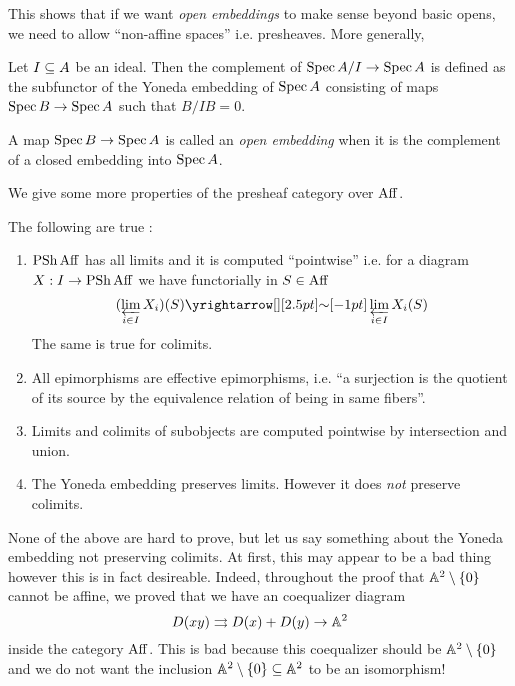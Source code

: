 \documentclass[./main.tex]{subfiles}
\begin{document}
This shows that if we want \emph{open embeddings} to make sense
beyond basic opens,
we need to allow ``non-affine spaces'' i.e. presheaves.
More generally,
\begin{dfn}

  Let $I \subseteq A$ be an ideal.
  Then the complement of $\operatorname{Spec} A / I \to \operatorname{Spec} A$
  is defined as the subfunctor of the Yoneda embedding of $\operatorname{Spec} A$
  consisting of maps $\operatorname{Spec} B \to \operatorname{Spec} A$
  such that $B / I B = 0$.

  A map $\operatorname{Spec} B \to \operatorname{Spec} A$ is called an \emph{open embedding}
  when it is the complement of a closed embedding into $\operatorname{Spec} A$.
\end{dfn}
We give some more properties of the presheaf category over $\mathrm{Aff}$.
\begin{prop}
  
  The following are true : 
  \begin{enumerate}
    \item $\operatorname{PSh} \mathrm{Aff}$ has all limits and it is computed
    ``pointwise'' i.e.
    for a diagram $X : I \to \operatorname{PSh} \mathrm{Aff}$ we have
    functorially in $S \in \mathrm{Aff}$
    \[
      (\LIM_{i \in I} X_i) (S) \map{\sim}{} \LIM_{i \in I} X_i(S)
    \]
    The same is true for colimits.
    \item All epimorphisms are effective epimorphisms,
    i.e. ``a surjection is the quotient of its source by 
    the equivalence relation of being in same fibers''.
    \item Limits and colimits of subobjects are computed pointwise
    by intersection and union.
    \item The Yoneda embedding preserves limits.
    However it does \emph{not} preserve colimits.
  \end{enumerate}
\end{prop}
None of the above are hard to prove,
but let us say something about the Yoneda embedding not preserving colimits.
At first, this may appear to be a bad thing
however this is in fact desireable.
Indeed, throughout the proof that $\mathbb{A}^2 \setminus \left\{0\right\}$ 
cannot be affine, we proved that we have an coequalizer diagram
\[
  D(x y) \rightrightarrows D(x) + D(y) \to \mathbb{A}^2  
\]
inside the category $\mathrm{Aff}$.
This is bad because this coequalizer should be $\mathbb{A}^2 \setminus\left\{0\right\}$
and we do not want the inclusion $\mathbb{A}^2 \setminus \left\{0\right\} \subseteq \mathbb{A}^2$
to be an isomorphism!
\end{document}
